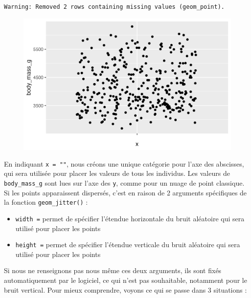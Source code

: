 \documentclass[
  letterpaper,
  DIV=11,
  numbers=noendperiod]{scrreprt}
\providecommand{\tightlist}{%
  \setlength{\itemsep}{0pt}\setlength{\parskip}{0pt}}\usepackage{longtable,booktabs,array}
\begin{document}
\begin{verbatim}
Warning: Removed 2 rows containing missing values (geom_point).
\end{verbatim}

\begin{figure}[H]

{\centering \includegraphics{./03-visualization_files/figure-pdf/unnamed-chunk-29-1.png}

}

\end{figure}

En indiquant \texttt{x\ =\ ""}, nous créons une unique catégorie pour
l'axe des abscisses, qui sera utilisée pour placer les valeurs de tous
les individus. Les valeurs de \texttt{body\_mass\_g} sont lues sur l'axe
des \texttt{y}, comme pour un nuage de point classique. Si les points
apparaissent dispersés, c'est en raison de 2 arguments spécifiques de la
fonction \texttt{geom\_jitter()} :

\begin{itemize}
\tightlist
\item
  \texttt{width\ =} permet de spécifier l'étendue horizontale du bruit
  aléatoire qui sera utilisé pour placer les points
\item
  \texttt{height\ =} permet de spécifier l'étendue verticale du bruit
  aléatoire qui sera utilisé pour placer les points
\end{itemize}

Si nous ne renseignons pas nous même ces deux arguments, ils sont fixés
automatiquement par le logiciel, ce qui n'est pas souhaitable, notamment
pour le bruit vertical. Pour mieux comprendre, voyons ce qui se passe
dans 3 situations :
\end{document}
